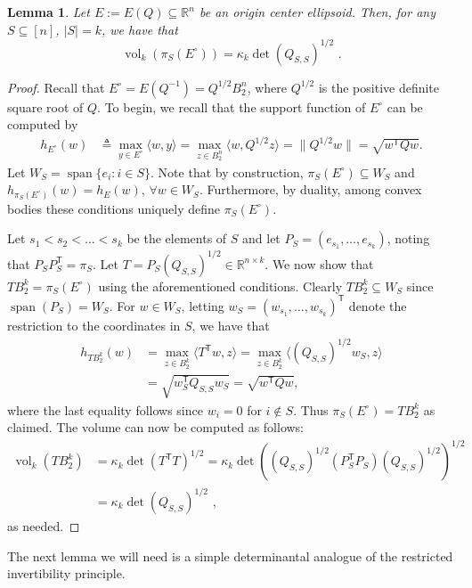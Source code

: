 \documentclass[11pt]{article}
\newtheorem{lemma}{Lemma}
\newcommand{\R}{{\mathbb{R}}}
\newcommand{\T}{\mathsf T}
\newcommand{\eqdef}{\triangleq}
\newcommand{\inner}[2]{\langle #1, #2 \rangle}
\DeclareMathOperator{\vol}{vol}
\DeclareMathOperator{\lspan}{span}
\begin{document}
\begin{lemma}\label{lem:ellipsoid-volumes}
Let $E := E(Q) \subseteq \R^n$ be an origin center ellipsoid. Then, for any
$S \subseteq [n]$, $|S| = k$, we have that 
\[
\vol_k(\pi_S(E^\circ)) = \kappa_k \det(Q_{S,S})^{1/2} \text{ .}
\]
\end{lemma}
\begin{proof}
Recall that $E^\circ = E(Q^{-1}) = Q^{1/2} B_2^n$, where $Q^{1/2}$ is the
positive definite square root of $Q$. To begin, we recall that the support
function of $E^\circ$ can be computed by
\begin{align*}
h_{E^\circ}(w) &\eqdef \max_{y \in E^\circ} \inner{w}{y} 
               = \max_{z \in B_2^n} \inner{w}{Q^{1/2} z} 
               = \|Q^{1/2} w\| = \sqrt{w^\T Q w}.
\end{align*}
Let $W_S = \lspan\{e_i: i \in S\}$. Note that by construction, $\pi_S(E^\circ)
\subseteq W_S$ and $h_{\pi_S(E^\circ)}(w) = h_{E}(w)$, $\forall w \in W_S$.
Furthermore, by duality, among convex bodies these conditions uniquely define $\pi_S(E^\circ)$. 

Let $s_1 < s_2 < \dots < s_k$ be the elements of $S$ and let $P_S =
(e_{s_1},\dots,e_{s_k})$, noting that $P_S P_S^\T = \pi_S$. Let $T = P_S
(Q_{S,S})^{1/2} \in \R^{n \times k}$. We now show that $TB_2^k = \pi_S(E^\circ)$
using the aforementioned conditions. Clearly $TB_2^k \subseteq W_S$ since
$\lspan(P_S) = W_S$. For $w \in W_S$, letting $w_S = (w_{s_1},\dots,w_{s_k})^\T$
denote the restriction to the coordinates in $S$, we have that 
\begin{align*}
h_{TB_2^k}(w) &= \max_{z \in B_2^k} \inner{T^\T w}{z} 
              = \max_{z \in B_2^k} \inner{(Q_{S,S})^{1/2} w_S}{z} \\ 
              &= \sqrt{w_S^\T Q_{S,S} w_S} = \sqrt{w^\T Q w} ,
\end{align*} 
where the last equality follows since $w_i = 0$ for $i \notin S$. Thus
$\pi_S(E^\circ) = TB_2^k$ as claimed. The volume can now be computed as follows:
\begin{align*}
\vol_k(TB_2^k) &= \kappa_k \det(T^\T T)^{1/2} 
               = \kappa_k \det((Q_{S,S})^{1/2} (P_S^\T P_S)
(Q_{S,S})^{1/2})^{1/2} \\
               &= \kappa_k \det(Q_{S,S})^{1/2} \text{ ,}
\end{align*}
as needed.
\end{proof}

The next lemma we will need is a simple determinantal analogue of the restricted
invertibility principle.
\end{document}
